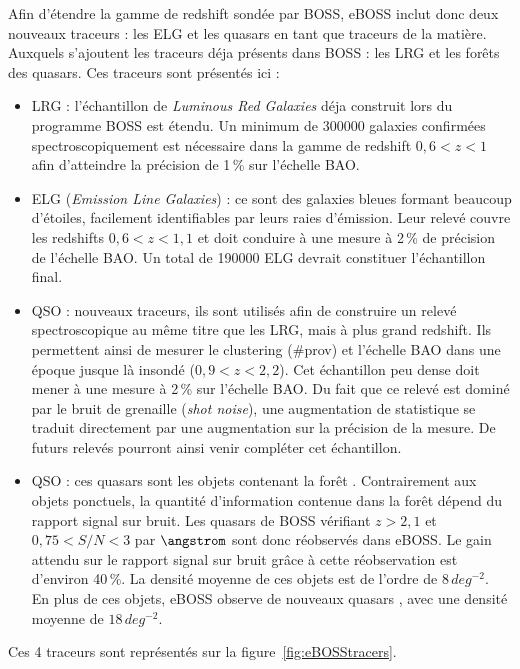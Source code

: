 \documentclass[11pt, twoside, a4paper, openright]{report}
\begin{document}
Afin d'étendre la gamme de redshift sondée par BOSS, eBOSS inclut donc deux nouveaux traceurs : les ELG et les quasars en tant que traceurs de la matière. Auxquels s'ajoutent les traceurs déja présents dans BOSS : les LRG et les forêts \lya des quasars. Ces traceurs sont présentés ici :
\begin{itemize}
\item LRG : l'échantillon de \emph{Luminous Red Galaxies} déja construit lors du programme BOSS est étendu. Un minimum de \num{300000} galaxies confirmées spectroscopiquement est nécessaire dans la gamme de redshift $0,6 < z < 1$ afin d'atteindre la précision de 1\,\% sur l'échelle BAO.
\item ELG (\emph{Emission Line Galaxies}) : ce sont des galaxies bleues formant beaucoup d'étoiles, facilement identifiables par leurs raies d'émission. Leur relevé couvre les redshifts $0,6 < z < 1,1$ et doit conduire à une mesure à 2\,\% de précision de l'échelle BAO. Un total de \num{190000} ELG devrait constituer l'échantillon final.
\item QSO : nouveaux traceurs, ils sont utilisés afin de construire un relevé spectroscopique au même titre que les LRG, mais à plus grand redshift. Ils permettent ainsi de mesurer le clustering (\#prov) et l'échelle BAO dans une époque jusque là insondé ($0,9 < z < 2,2$). Cet échantillon peu dense doit mener à une mesure à 2\,\% sur l'échelle BAO. Du fait que ce relevé est dominé par le bruit de grenaille (\emph{shot noise}), une augmentation de statistique se traduit directement par une augmentation sur la précision de la mesure. De futurs relevés pourront ainsi venir compléter cet échantillon.
\item \lya QSO : ces quasars sont les objets contenant la forêt \lya. Contrairement aux objets ponctuels, la quantité d'information contenue dans la forêt \lya dépend du rapport signal sur bruit. Les quasars \lya de BOSS vérifiant $z > 2,1$ et $0,75 < S/N < 3$ par $\angstrom$ sont donc réobservés dans eBOSS. Le gain attendu sur le rapport signal sur bruit grâce à cette réobservation est d'environ 40\,\%. La densité moyenne de ces objets est de l'ordre de $8\,deg^{-2}$. \\
  En plus de ces objets, eBOSS observe de nouveaux quasars \lya, avec une densité moyenne de $18\,deg^{-2}$.
\end{itemize}
Ces 4 traceurs sont représentés sur la figure~\ref{fig:eBOSStracers}.
\end{document}
